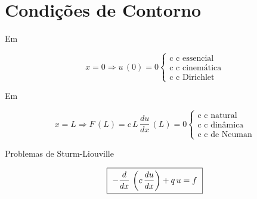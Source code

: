 \section{Condições de Contorno}

Em

\begin{equation}
 \label{cap6:sec5:eq2}
 x = 0 \Rightarrow u\,(0) = 0
 \left\{
 \begin{array}{l}
  \mbox{c c essencial} \\
  \mbox{c c cinemática} \\
  \mbox{c c Dirichlet}
 \end{array}
 \right.
\end{equation}

Em

\begin{equation}
 \label{cap6:sec5:eq3}
 x = L \Rightarrow F\,(L) = c \, L \, \frac{du}{dx} \, (L) = 0
 \left\{
 \begin{array}{l}
  \mbox{c c natural} \\
  \mbox{c c dinâmica} \\
  \mbox{c c de Neuman}
 \end{array}
 \right.
\end{equation}

Problemas de Sturm-Liouville

\begin{equation}
 \label{cap6:sec5:eq4}
 \mbox{ \framebox{ $ - \displaystyle \frac{d}{dx} \, \left(c \, \displaystyle \frac{du}{dx} \right) + q \, u = f $ } }
\end{equation}

